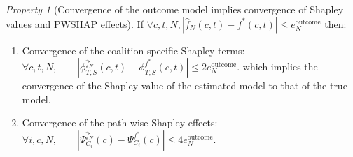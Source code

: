 \documentclass{article}
\theoremstyle{plain}
\theoremstyle{definition}
\theoremstyle{remark}
\newcommand{\effect}{\Psi}
\theoremstyle{mystyle}
\newtheorem{property}{Property}[section]
\newcommand{\coalitionshapley}[4]{\phi^{#1}_{#3,#2}(#4)}
\begin{document}




\begin{property}[Convergence of the outcome model implies convergence of Shapley values and PWSHAP effects] \label{prop:error_bounds_outcome} 
If $\forall c, t, N, | \hat{f}_N(c,t) - f^*(c,t) | \leq e^\text{outcome}_N$ then:
\begin{enumerate}[leftmargin=4mm]
    \item Convergence of the coalition-specific Shapley terms: $\forall c, t, N, \qquad | \coalitionshapley{\hat{f}_N}{S}{T}{c,t} -  \coalitionshapley{f^*}{S}{T}{c,t} | \leq 2 e^\text{outcome}_N.$
    which implies the convergence of the Shapley value of the estimated model to that of the true model.
    \item Convergence of the path-wise Shapley effects: $\forall i, c, N, \qquad | \effect^{\hat{f}_N}_{C_i}(c) - \effect^{f^*}_{C_i}(c) | \leq 4 e^\text{outcome}_N.$
\end{enumerate}
\end{property}
\end{document}

